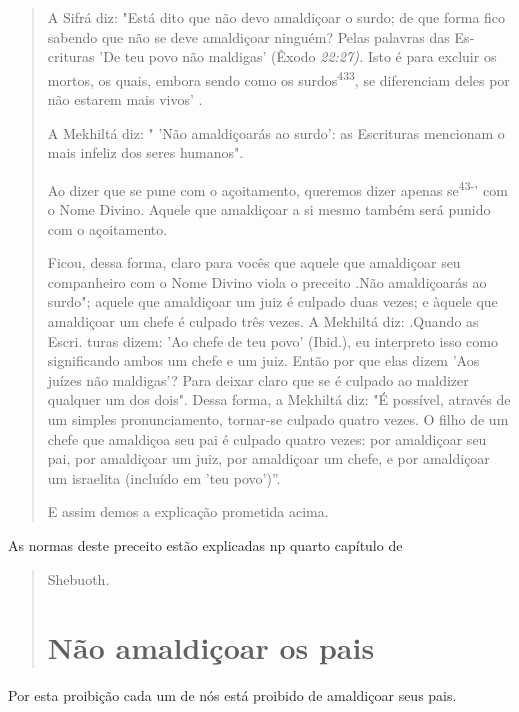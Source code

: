\begin{quote}
A Sifrá diz: "Está dito que não devo amaldiçoar o surdo; de que for­ma
fico sabendo que não se deve amaldiçoar ninguém? Pelas palavras das
Es­crituras 'De teu povo não maldigas' (Êxodo \emph{22:27).} Isto é para
excluir os mor­tos, os quais, embora sendo como os
surdos\textsuperscript{433}, se diferenciam deles por não estarem mais
vivos' .

A Mekhiltá diz: " 'Não amaldiçoarás ao surdo': as Escrituras mencio­nam
o mais infeliz dos seres humanos".

Ao dizer que se pune com o açoitamento, queremos dizer apenas
se\textsuperscript{43-}' com o Nome Divino. Aquele que amaldiçoar a si
mesmo também será pu­nido com o açoitamento.

Ficou, dessa forma, claro para vocês que aquele que amaldiçoar seu
companheiro com o Nome Divino viola o preceito .Não
amaldiçoarás ao surdo"; aquele que amaldiçoar um juiz é culpado duas
vezes; e àquele que amaldiçoar um chefe é culpado três vezes. A Mekhiltá
diz: .Quando as Escri­. turas dizem: 'Ao chefe de teu
povo' (Ibid.), eu interpreto isso como significan­do ambos um chefe e um
juiz. Então por que elas dizem 'Aos juízes não maldi­gas'? Para deixar
claro que se é culpado ao maldizer qualquer um dos dois". Dessa forma, a
Mekhiltá diz: "É possível, através de um simples pronuncia­mento,
tornar-se culpado quatro vezes. O filho de um chefe que amaldiçoa seu
pai é culpado quatro vezes: por amaldiçoar seu pai, por amaldiçoar um
juiz, por amaldiçoar um chefe, e por amaldiçoar um israelita (incluído
em 'teu povo')''.

E assim demos a explicação prometida acima.
\end{quote}

As normas deste preceito estão explicadas np quarto capítulo de

\begin{quote}
Shebuoth.

\section{Não amaldiçoar os pais}
\end{quote}

Por esta proibição cada um de nós está proibido de amaldiçoar seus pais.

